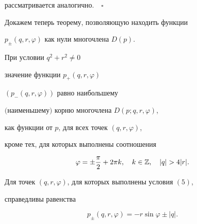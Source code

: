 рассматривается аналогично.$\quad\square$





Докажем теперь теорему, позволяющую находить функции


$p_\pm (q,r,\varphi)$ как нули многочлена $D(p)$.





\begin{thm}


При условии $q^2+r^2 \ne 0$


значение функции $p_+(q,r,\varphi)$


$(p_- (q,r,\varphi))$ равно наибольшему


$($наименьшему$)$ корню многочлена $D(p;q,r,\varphi)$,


как функции от $p$, для всех точек $(q,r,\varphi)$,


кроме тех, для которых выполнены соотношения


\begin{equation}


\varphi=\pm \frac{\pi}{2}+2\pi k,\quad k \in\Bbb Z,\quad | q | > 4 | r |.


\end{equation}


Для точек $(q,r,\varphi)$, для которых выполнены условия $(5)$,


справедливы равенства


$$


p_\pm (q,r,\varphi)=- r\sin \varphi \pm | q |.


$$


\end{thm}





